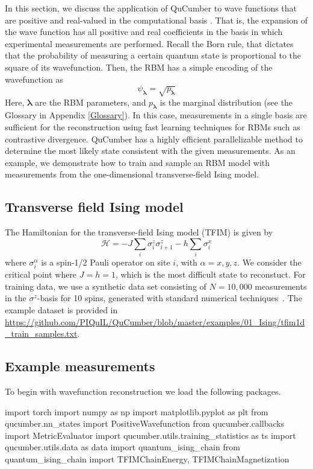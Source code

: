 \documentclass[submission, Phys]{SciPost}
\begin{document}
In this section, we discuss the application of QuCumber to wave functions that are positive and real-valued in the computational basis .
That is, the expansion of the wave function has all positive and real coefficients in the basis in which experimental
measurements are performed.
Recall the Born rule, that dictates that the probability of measuring a certain quantum state is proportional to the square of its wavefunction.  
Then, the RBM has a simple encoding of the wavefunction as
\begin{equation}
\psi_{\bm{\lambda}}= \sqrt{p_{\bm{\lambda}}}
\end{equation}  
Here, ${\bm \lambda}$ are the RBM parameters, and $p_{\bm{\lambda}}$ is the marginal distribution (see the Glossary in Appendix \ref{Glossary}).
In this case, measurements in a single basis are sufficient for the reconstruction using fast learning techniques for RBMs such as contrastive divergence.
QuCumber has a highly efficient parallelizable method to determine the most likely state consistent with the given measurements.
As an example, we demonstrate how to train and sample an RBM model with measurements from the one-dimensional transverse-field Ising model.

\subsection{Transverse field Ising model}
\label{Sec:Training_TFIM}

The Hamiltonian for the transverse-field Ising model (TFIM) is given by
\begin{equation}
	\mathcal{H} = -J\sum_i \sigma^z_i \sigma^z_{i+1} - h \sum_i \sigma^x_i \label{TFIM}	
\end{equation}
where $\sigma^{\alpha}_i$ is a spin-1/2 Pauli operator on site $i$, with $\alpha=x,y,z$. We consider the critical point where $J=h=1$, which is the most difficult state to reconstuct.
For training data, we use a synthetic data set consisting of $N=10,000$ measurements in the $\sigma^z$-basis for 10 spins, generated with standard numerical techniques~\cite{itensor}.
The example dataset is provided in \url{https://github.com/PIQuIL/QuCumber/blob/master/examples/01_Ising/tfim1d_train_samples.txt}.


\subsection{Example measurements}
To begin with wavefunction reconstruction we load the following packages.
\begin{python}
import torch
import numpy as np
import matplotlib.pyplot as plt
from qucumber.nn_states import PositiveWavefunction
from qucumber.callbacks import MetricEvaluator
import qucumber.utils.training_statistics as ts
import qucumber.utils.data as data
import quantum_ising_chain
from quantum_ising_chain import TFIMChainEnergy, TFIMChainMagnetization
\end{python}
\end{document}
